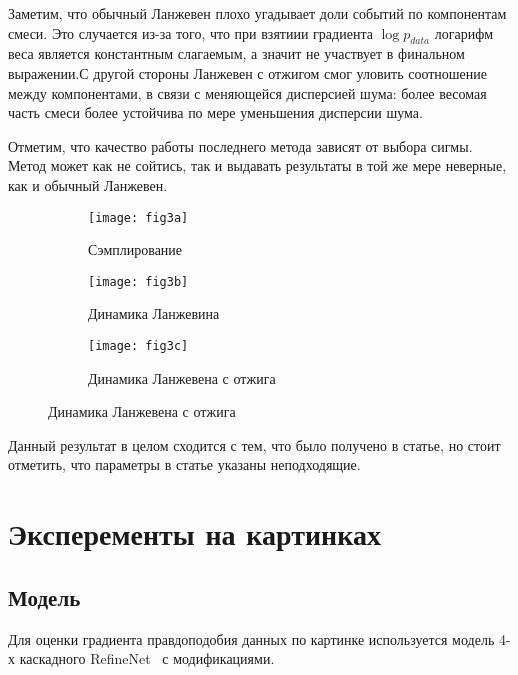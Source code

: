 \documentclass{article}
\begin{document}
Заметим, что обычный Ланжевен плохо угадывает доли событий по компонентам смеси. Это случается из-за того, что при взятиии градиента $\log p_{data}$ логарифм веса является константным слагаемым, а значит не участвует в финальном выражении.С другой стороны Ланжевен с отжигом смог уловить соотношение между компонентами, в связи с меняющейся дисперсией шума: более весомая часть смеси более устойчива по мере уменьшения дисперсии шума.


Отметим, что качество работы последнего метода зависят от выбора сигмы. Метод может как не сойтись, так и выдавать результаты в той же мере неверные, как и обычный Ланжевен.




\begin{figure}[H]
	\centering
	\begin{subfigure}[b]{0.4\textwidth}
		\texttt{[image: fig3a]}
		\caption{Сэмплирование}
		\label{fig:3a}
	\end{subfigure}
	\begin{subfigure}[b]{0.4\textwidth}
		\texttt{[image: fig3b]}
		\caption{Динамика Ланжевина}
		\label{fig:3b}
	\end{subfigure}
	\begin{subfigure}[b]{0.4\textwidth}
		\texttt{[image: fig3c]}
		\caption{Динамика Ланжевена с отжига}
		\label{fig:3c}
	\end{subfigure}
\end{figure}

Данный результат в целом сходится с тем, что было получено в статье, но стоит отметить, что параметры в статье указаны неподходящие.



\section{Эксперементы на картинках}

\subsection{Модель}

Для оценки градиента правдоподобия данных по картинке используется модель 4-х
каскадного RefineNet~\cite{DBLP:journals/corr/LinMS016} с модификациями.
\end{document}
